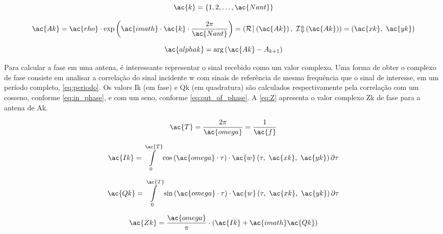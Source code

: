 \begin{equation} \label{eq:ant:idx} %
	\ac{k} = \left\{1, 2, \dotsc, \ac{Nant}\right\}
\end{equation}

\begin{equation} \label{eq:ant:coord}
	\ac{Ak} =
    \ac{rho}
    \cdot \exp\left(\ac{imath}\cdot \ac{k} \cdot \frac{2\pi}{\ac{Nant}}\right) =
    \left( \operatorname{\mathcal{Re}}\left( \ac{Ak} \right), ~\operatorname{\mathcal{Im}}\left( \ac{Ak} \right) \right) =
    \left( \ac{xk}, ~ \ac{yk} \right)
\end{equation}

\begin{equation} \label{eq:ant:angle}
	\ac{alphak} = \arg\left( \ac{Ak} - A_{k+1} \right)
\end{equation}


Para calcular a fase em uma antena, é interessante representar o sinal recebido como um valor complexo.
Uma forma de obter o complexo de fase consiste em analisar a correlação do sinal incidente \ac{w} com sinais de referência de mesma frequência que o sinal de interesse, em um período completo, \autoref{eq:periodo}.
Os valors \ac{Ik} (em fase) e \ac{Qk} (em quadratura) são calculados respectivamente pela correlação com um cosseno, conforme \autoref{eq:in_phase}, e com um seno, conforme \autoref{eq:out_of_phase}.
A \autoref{eq:Z} apresenta o valor complexo \ac{Zk} de fase para a antena de \ac{Ak}.


\begin{equation} \label{eq:periodo}
    \ac{T} = \frac{2\pi}{\ac{omega}} = \frac{1}{\ac{f}}
\end{equation}

\begin{equation} \label{eq:in_phase}
    \ac{Ik} =
    \int\limits_0^{\ac{T}} \cos\left(\ac{omega} \cdot\tau\right)
    \cdot \ac{w}\left( \tau, ~\ac{xk}, ~\ac{yk} \right) \partial \tau
\end{equation}

\begin{equation} \label{eq:out_of_phase}
    \ac{Qk} =
    \int\limits_0^{\ac{T}} \sin\left(\ac{omega}\cdot\tau\right)
    \cdot \ac{w}\left( \tau, ~\ac{xk}, ~\ac{yk} \right) \partial \tau
\end{equation}

\begin{equation} \label{eq:Z}
    \ac{Zk} =
    \frac{\ac{omega}}{\pi}\cdot\left(\ac{Ik} + \ac{imath} \ac{Qk}\right)
\end{equation}

